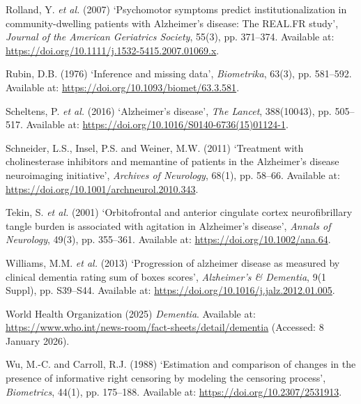 \documentclass[
  9pt,
  letterpaper,
  DIV=11,
  numbers=noendperiod]{scrartcl}
\newlength{\cslhangindent}
\newenvironment{CSLReferences}[2] %
 {\begin{list}{}{%
  \setlength{\itemindent}{0pt}
  \setlength{\leftmargin}{0pt}
  \setlength{\parsep}{0pt}
  \ifodd #1
   \setlength{\leftmargin}{\cslhangindent}
   \setlength{\itemindent}{-1\cslhangindent}
  \fi
  \setlength{\itemsep}{#2\baselineskip}}}
 {\end{list}}
\begin{document}
\begin{CSLReferences}{0}{1}
Rolland, Y. \emph{et al.} (2007) {`Psychomotor symptoms predict
institutionalization in community-dwelling patients with {Alzheimer}'s
disease: The REAL.FR study'}, \emph{Journal of the American Geriatrics
Society}, 55(3), pp. 371--374. Available at:
\url{https://doi.org/10.1111/j.1532-5415.2007.01069.x}.

Rubin, D.B. (1976) {`Inference and missing data'}, \emph{Biometrika},
63(3), pp. 581--592. Available at:
\url{https://doi.org/10.1093/biomet/63.3.581}.

Scheltens, P. \emph{et al.} (2016) {`Alzheimer's disease'}, \emph{The
Lancet}, 388(10043), pp. 505--517. Available at:
\url{https://doi.org/10.1016/S0140-6736(15)01124-1}.

Schneider, L.S., Insel, P.S. and Weiner, M.W. (2011) {`Treatment with
cholinesterase inhibitors and memantine of patients in the {Alzheimer}'s
disease neuroimaging initiative'}, \emph{Archives of Neurology}, 68(1),
pp. 58--66. Available at:
\url{https://doi.org/10.1001/archneurol.2010.343}.

Tekin, S. \emph{et al.} (2001) {`Orbitofrontal and anterior cingulate
cortex neurofibrillary tangle burden is associated with agitation in
{Alzheimer}'s disease'}, \emph{Annals of Neurology}, 49(3), pp.
355--361. Available at: \url{https://doi.org/10.1002/ana.64}.

Williams, M.M. \emph{et al.} (2013) {`Progression of alzheimer disease
as measured by clinical dementia rating sum of boxes scores'},
\emph{Alzheimer's \& Dementia}, 9(1 Suppl), pp. S39--S44. Available at:
\url{https://doi.org/10.1016/j.jalz.2012.01.005}.

World Health Organization (2025) \emph{Dementia}. Available at:
\url{https://www.who.int/news-room/fact-sheets/detail/dementia}
(Accessed: 8 January 2026).

Wu, M.-C. and Carroll, R.J. (1988) {`Estimation and comparison of
changes in the presence of informative right censoring by modeling the
censoring process'}, \emph{Biometrics}, 44(1), pp. 175--188. Available
at: \url{https://doi.org/10.2307/2531913}.

\end{CSLReferences}
\end{document}

